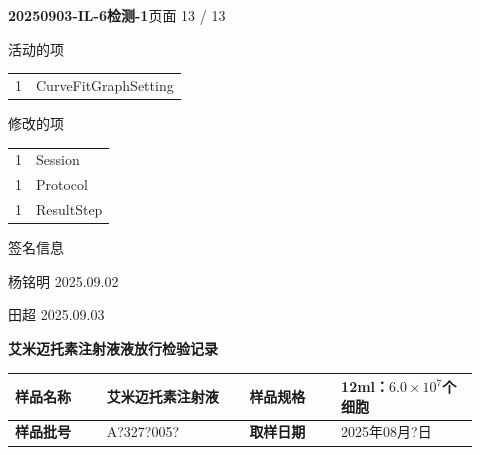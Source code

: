 \documentclass[UTF8,10pt,a4paper,fontset=fandol]{ctexart}
\newcommand{\fieldvalue}[1]{#1}
\newcommand{\handwritten}[1]{#1}
\begin{document}
\newpage

\noindent\textbf{20250903-IL-6检测-1}\hfill 页面 13 / 13

\vspace{1em}

\noindent 活动的项

\begin{tabular}{@{}ll@{}}
1 & CurveFitGraphSetting
\end{tabular}

\vspace{0.5em}

\noindent 修改的项

\begin{tabular}{@{}ll@{}}
1 & Session\\
1 & Protocol\\
1 & ResultStep
\end{tabular}

\vspace{1em}

\noindent 签名信息

\vfill

\begin{flushright}
\handwritten{杨铭明}\quad
\handwritten{2025.09.02}

\vspace{1em}

\handwritten{田超}\quad
\handwritten{2025.09.03}
\end{flushright}

\newpage

\begin{center}
\textbf{艾米迈托素注射液液放行检验记录}
\end{center}

\begin{tabular}{|p{0.18\linewidth}|p{0.29\linewidth}|p{0.18\linewidth}|p{0.27\linewidth}|}
\hline
\textbf{样品名称} &
\fieldvalue{艾米迈托素注射液} &
\textbf{样品规格} &
\fieldvalue{12ml：$6.0\times10^{7}$个细胞}
\\ \hline
\textbf{样品批号} &
\fieldvalue{\handwritten{A?327?005?}} &
\textbf{取样日期} &
\fieldvalue{\handwritten{2025年08月?日}}
\\ \hline
\end{tabular}
\end{document}

